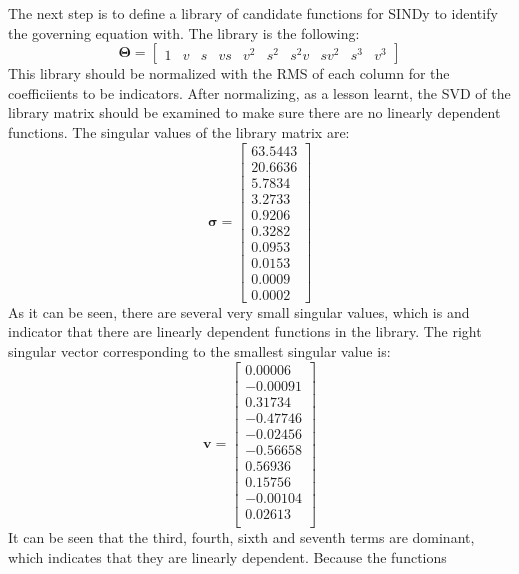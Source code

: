 ﻿\documentclass[12pt,a4paper]{article}
\begin{document}
The next step is to define a library of candidate functions for SINDy to identify
the governing equation with. The library is the following:
\begin{equation}
    \bm{\Theta} = \begin{bmatrix}
    1 & v & s & vs & v^2 & s^2 & s^2v & sv^2 & s^3 & v^3
    \end{bmatrix}
\end{equation}
This library should be normalized with the RMS of each column for the coefficiients to be
indicators. After normalizing, as a lesson learnt, the SVD of the library matrix should be
examined to make sure there are no linearly dependent functions. The singular
values of the library matrix are:
\begin{equation}
    \bm{\sigma} = \begin{bmatrix}
    63.5443 \\
    20.6636 \\
    5.7834 \\
    3.2733 \\
    0.9206 \\
    0.3282 \\
    0.0953 \\
    0.0153 \\
    0.0009 \\
    0.0002
    \end{bmatrix}
\end{equation}
As it can be seen, there are several very small singular values, which is and indicator
that there are linearly dependent functions in the library. The right singular
vector corresponding to the smallest singular value is:
\begin{equation}
    \bm{v} = \begin{bmatrix}
    0.00006 \\
    -0.00091 \\
    0.31734 \\
    -0.47746 \\
    -0.02456 \\
    -0.56658 \\
    0.56936 \\
    0.15756 \\
    -0.00104 \\
    0.02613 \\
    \end{bmatrix}
\end{equation}
It can be seen that the third, fourth, sixth and seventh terms are dominant, 
which indicates that they are linearly dependent. Because the functions
\end{document}
